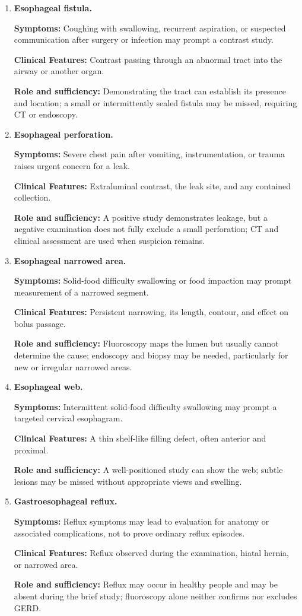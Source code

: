 \begin{enumerate}[leftmargin=*,itemsep=0.45em,topsep=0.4em]
\item \textbf{Esophageal fistula.}\par\noindent\textbf{Symptoms:} Coughing with swallowing, recurrent aspiration, or suspected communication after surgery or infection may prompt a contrast study.\par\noindent\textbf{Clinical Features:} Contrast passing through an abnormal tract into the airway or another organ.\par\noindent\textbf{Role and sufficiency:} Demonstrating the tract can establish its presence and location; a small or intermittently sealed fistula may be missed, requiring CT or endoscopy.
\item \textbf{Esophageal perforation.}\par\noindent\textbf{Symptoms:} Severe chest pain after vomiting, instrumentation, or trauma raises urgent concern for a leak.\par\noindent\textbf{Clinical Features:} Extraluminal contrast, the leak site, and any contained collection.\par\noindent\textbf{Role and sufficiency:} A positive study demonstrates leakage, but a negative examination does not fully exclude a small perforation; CT and clinical assessment are used when suspicion remains.
\item \textbf{Esophageal narrowed area.}\par\noindent\textbf{Symptoms:} Solid-food difficulty swallowing or food impaction may prompt measurement of a narrowed segment.\par\noindent\textbf{Clinical Features:} Persistent narrowing, its length, contour, and effect on bolus passage.\par\noindent\textbf{Role and sufficiency:} Fluoroscopy maps the lumen but usually cannot determine the cause; endoscopy and biopsy may be needed, particularly for new or irregular narrowed areas.
\item \textbf{Esophageal web.}\par\noindent\textbf{Symptoms:} Intermittent solid-food difficulty swallowing may prompt a targeted cervical esophagram.\par\noindent\textbf{Clinical Features:} A thin shelf-like filling defect, often anterior and proximal.\par\noindent\textbf{Role and sufficiency:} A well-positioned study can show the web; subtle lesions may be missed without appropriate views and swelling.
\item \textbf{Gastroesophageal reflux.}\par\noindent\textbf{Symptoms:} Reflux symptoms may lead to evaluation for anatomy or associated complications, not to prove ordinary reflux episodes.\par\noindent\textbf{Clinical Features:} Reflux observed during the examination, hiatal hernia, or narrowed area.\par\noindent\textbf{Role and sufficiency:} Reflux may occur in healthy people and may be absent during the brief study; fluoroscopy alone neither confirms nor excludes GERD.

\end{enumerate}
